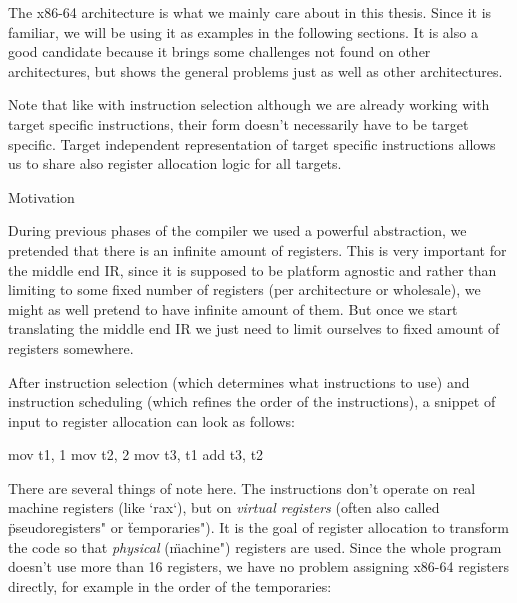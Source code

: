 The x86-64 architecture is what we mainly care about in
this thesis. Since it is familiar, we will be using it as examples in the
following sections. It is also a good candidate because it brings some
challenges not found on other architectures, but shows the general problems just
as well as other architectures.

Note that like with instruction selection although we are already working with
target specific instructions, their form doesn't necessarily have to be target
specific. Target independent representation of target specific instructions
allows us to share also register allocation logic for all targets.

\secc Motivation

During previous phases of the compiler we used a powerful abstraction, we
pretended that there is an infinite amount of registers. This is very important
for the middle end IR, since it is supposed to be platform agnostic and rather
than limiting to some fixed number of registers (per architecture or wholesale),
we might as well pretend to have infinite amount of them. But once we start
translating the middle end IR we just need to limit ourselves to fixed amount of
registers somewhere.

After instruction selection (which determines what instructions to use) and
instruction scheduling (which refines the order of the instructions), a snippet
of input to register allocation can look as follows:

\begtt
mov t1, 1
mov t2, 2
mov t3, t1
add t3, t2
\endtt

%
%


There are several things of note here. The instructions don't operate on real
machine registers (like `rax`), but on {\em virtual registers} (often also called
\"pseudoregisters" or \"temporaries"). It is the goal of register allocation to
transform the code so that {\em physical} (\"machine") registers are used.
Since the whole program doesn't use more than 16 registers, we have no problem
assigning x86-64 registers directly, for example in the order of the
temporaries:

